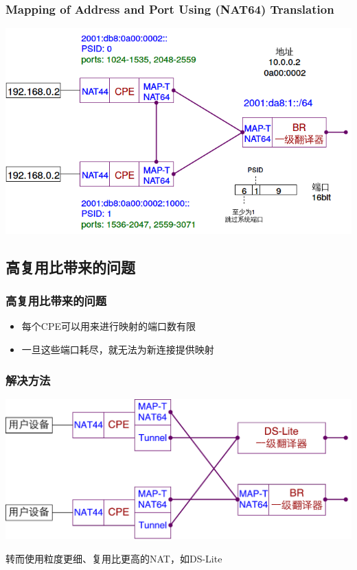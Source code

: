 \documentclass{beamer}
\begin{document}
\begin{frame}
  \frametitle{Mapping of Address and Port Using (NAT64) Translation}

  \includegraphics[width=\textwidth]{figs/MAP-T-details.png}  
\end{frame}

\subsection{高复用比带来的问题}

\begin{frame}
  \frametitle{高复用比带来的问题}

  \begin{itemize}
  \item 每个CPE可以用来进行映射的端口数有限
  \item 一旦这些端口耗尽，就无法为新连接提供映射
  \end{itemize}
\end{frame}

\begin{frame}
  \frametitle{解决方法}
  \includegraphics[width=\textwidth]{figs/MAP-T-DS-Lite.pdf}  

  转而使用粒度更细、复用比更高的NAT，如DS-Lite
\end{frame}
\end{document}
